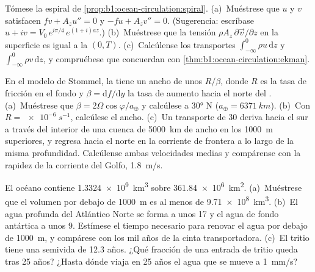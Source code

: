 \begin{exercise}[$\star\star\star$]\label{exo:b1:ocean-circulation:10}
Tómese la espiral de \cref{prop:b1:ocean-circulation:spiral}. (a)~Muéstrese que $u$ y $v$
satisfacen $f v + A_z u'' = 0$ y $-f u + A_z v'' = 0$. (Sugerencia: escríbase $u + iv =
V_0\,e^{i\pi/4}\,e^{(1+i)az}$.) (b)~Muéstrese que la tensión $\rho A_z\,\partial\vec
v/\partial z$ en la superficie es igual a la  $(0, T)$. (c)~Calcúlense los
transportes $\int_{-\infty}^0 \rho u\,\mathrm dz$ y $\int_{-\infty}^0 \rho
v\,\mathrm dz$, y compruébese que concuerdan con
\cref{thm:b1:ocean-circulation:ekman}.
\end{exercise}

\begin{exercise}[$\star\star\star$]\label{exo:b1:ocean-circulation:11}
En el modelo de Stommel, la  tiene un ancho de unos $R/\beta$, donde $R$ es la tasa de fricción en el fondo y $\beta = \mathrm df/\mathrm dy$ la
tasa de aumento hacia el norte del . (a)~Muéstrese que $\beta = 2\Omega
\cos\varphi/a_\oplus$ y calcúlese a \ang{30} N ($a_\oplus = \qty{6371}{km}$). (b)~Con $R = \qty{e-6}{s^{-1}}$, calcúlese el ancho. (c)~Un transporte de \qty{30}{\sverdrup} deriva hacia el sur a través del interior de una cuenca de \qty{5000}{km} de ancho en los \qty{1000}{m} superiores, y regresa hacia el norte en la corriente de frontera a lo largo de la misma profundidad. Calcúlense ambas velocidades medias y compárense con la rapidez de la corriente del Golfo, \qty{1.8}{m/s}.
\end{exercise}

\begin{exercise}[$\star\star\star$]\label{exo:b1:ocean-circulation:12}
El océano contiene \qty{1.3324e9}{km^3} sobre \qty{361.84e6}{km^2}. (a)~Muéstrese que el volumen por debajo de \qty{1000}{m} es al menos de \qty{9.71e8}{km^3}. (b)~El agua profunda del Atlántico Norte se forma a unos \qty{17}{\sverdrup} y el agua de fondo antártica a unos \qty{9}{\sverdrup}. Estímese el tiempo necesario para renovar el agua por debajo de \qty{1000}{m}, y compárese con los mil años de la cinta transportadora. (c)~El tritio tiene una semivida de 12.3 años. ¿Qué fracción de una entrada de tritio queda tras 25 años? ¿Hasta dónde viaja en 25 años el agua que se mueve a \qty{1}{mm/s}?
\end{exercise}

